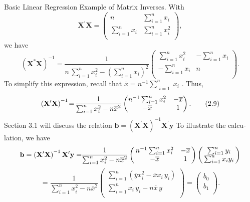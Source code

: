 \documentclass[11pt]{article}
\begin{document}
Basic Linear Regression Example of Matrix Inverses. With
\[
\mathbf{X}^{\prime} \mathbf{X}=\! \left( \begin{matrix} {n} & {\sum_{i=1}^{n} x_{i}} \\ {\sum_{i=1}^{n} x_{i}} & {\sum_{i=1}^{n} x_{i}^{2}} \\ \end{matrix} \right) ,
\]
we have
\[
\left( \mathbf{X}^{*} \mathbf{X} \right)^{-1} \!=\! \! \frac{1} {n \, \sum_{i=1}^{n} x_{i}^{2}-\left( \sum_{i=1}^{n} x_{i} \right)^{2}} \left( \begin{matrix} {\sum_{i=1}^{n} x_{i}^{2}} & {-\sum_{i=1}^{n} x_{i}} \\ {-\sum_{i=1}^{n} x_{i}} & {n} \\ \end{matrix} \right) .
\]
To simplify this expression, recall that \(\overline{{x}}=n^{-1} \sum_{\substack{i=1}}^{n} x_{i}\) . Thus,
\[
{\bf( X^{\prime} {\bf X} )}^{-1} \!=\! \frac{1} {\sum_{i=1}^{n} x_{i}^{2}-n \overline{{x}}^{2}} \left( \begin{matrix} {n^{-1} \sum_{i=1}^{n} x_{i}^{2}} & {-\overline{{x}}} \\ {-\overline{{x}}} & {1} \\ \end{matrix} \right) . \tag{2.9}
\]
 Section 3.1 will discuss the relation \(\mathbf{b}=\left( \mathbf{X}^{\prime} \mathbf{X} \right)^{-1} \mathbf{X}^{\prime} \mathbf{y}\) To illustrate the calcu-
lation, we have
\[
\mathbf{b}=\left( \mathbf{X}^{\prime} \mathbf{X} \right)^{-1} \mathbf{X}^{\prime} \mathbf{y}=\! \! \frac{1} {\sum_{i=1}^{n} x_{i}^{2}-n \overline{{x}}^{2}} \left( \! \! \begin{array} {c c} {n^{-1} \sum_{i=1}^{n} x_{i}^{2}} & {-\overline{{x}}} \\ {-\overline{{x}}} & {1} \\ \end{array} \! \! \right) \left( \! \! \begin{array} {c} {\sum_{i=1}^{n} y_{i}} \\ {\sum_{i=1}^{n} x_{i} y_{i}} \\ \end{array} \! \! \right)
\]
\[
= \frac{1} {\sum_{i=1}^{n} x_{i}^{2}-n \overline{x}^{2}} \left( \begin{aligned} {\sum_{i=1}^{n} \left( \overline{y} x_{i}^{2}-\overline{x} x_{i} \, y_{i} \right)} \\ {\sum_{i=1}^{n} x_{i} \, y_{i}-n \overline{x} \, y} \\ \end{aligned} \right)=\left( \begin{matrix} {b_{0}} \\ {b_{1}} \\ \end{matrix} \right) .
\]
\end{document}
